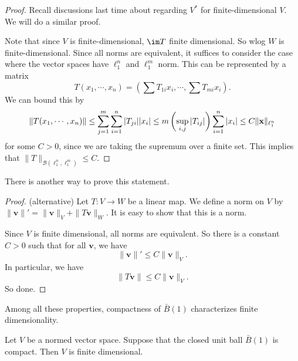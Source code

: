 \documentclass[a4paper]{article}
\begin{document}
\begin{proof}
  Recall discussions last time about regarding $V^*$ for finite-dimensional $V$. We will do a similar proof.

  Note that since $V$ is finite-dimensional, $\im T$ finite dimensional. So wlog $W$ is finite-dimensional. Since all norms are equivalent, it suffices to consider the case where the vector spaces have $\ell_1^n$ and $\ell_1^m$ norm. This can be represented by a matrix
  \[
    T(x_1, \cdots, x_n) = \left(\sum T_{1i}x_i, \cdots, \sum T_{mi}x_i\right).
  \]
  We can bound this by
  \[
    \|T(x_1, \cdots, x_n)\| \leq \sum_{j = 1}^m \sum_{i = 1}^n |T_{ji}||x_i|\\ \leq m \left(\sup_{i, j}|T_{ij}|\right) \sum_{i = 1}^n |x_i| \leq C \|\mathbf{x}\|_{\ell_1^n}
  \]
  for some $C > 0$, since we are taking the supremum over a finite set. This implies that $\|T\|_{\mathcal{B}(\ell_1^n, \ell_1^m)} \leq C$.
\end{proof}

There is another way to prove this statement.
\begin{proof}(alternative)
  Let $T: V\to W$ be a linear map. We define a norm on $V$ by $\|\mathbf{v}\|' = \|\mathbf{v}\|_V + \| T \mathbf{v}\|_W$. It is easy to show that this is a norm.

  Since $V$ is finite dimensional, all norms are equivalent. So there is a constant $C>0$ such that for all $\mathbf{v}$, we have
  \[
    \|\mathbf{v}\|' \leq C\|\mathbf{v}\|_V.
  \]
  In particular, we have
  \[
    \|T\mathbf{v}\| \leq C\|\mathbf{v}\|_V.
  \]
  So done.
\end{proof}

Among all these properties, compactness of $\bar{B}(1)$ characterizes finite dimensionality.
\begin{prop}
  Let $V$ be a normed vector space. Suppose that the closed unit ball $\bar{B}(1)$ is compact. Then $V$ is finite dimensional.
\end{prop}
\end{document}

